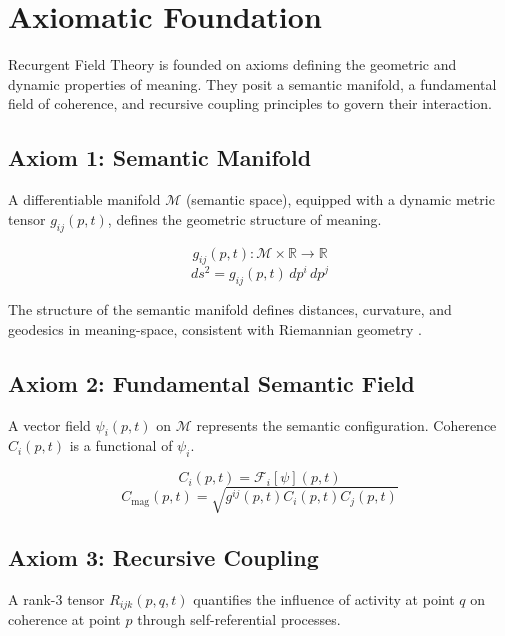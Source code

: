\chapter{Axiomatic Foundation}

Recurgent Field Theory is founded on axioms defining the geometric and dynamic properties of meaning. They posit a semantic manifold, a fundamental field of coherence, and recursive coupling principles to govern their interaction.

\section{Axiom 1: Semantic Manifold}

A differentiable manifold \(\mathcal{M}\) (semantic space), equipped with a dynamic metric tensor \(g_{ij}(p,t)\), defines the geometric structure of meaning.

\begin{equation}
g_{ij}(p,t) : \mathcal{M} \times \mathbb{R} \rightarrow \mathbb{R}
\end{equation}
\begin{equation}
ds^2 = g_{ij}(p,t) \, dp^i \, dp^j
\end{equation}

The structure of the semantic manifold defines distances, curvature, and geodesics in meaning-space, consistent with Riemannian geometry \autocite{Riemann1868}.

\section{Axiom 2: Fundamental Semantic Field}

A vector field \(\psi_i(p,t)\) on \(\mathcal{M}\) represents the semantic configuration. Coherence \(C_i(p,t)\) is a functional of \(\psi_i\).

\begin{equation}
C_i(p,t) = \mathcal{F}_i[\psi](p,t)
\end{equation}
\begin{equation}
C_{\text{mag}}(p,t) = \sqrt{g^{ij}(p,t) C_i(p,t) C_j(p,t)}
\end{equation}

\section{Axiom 3: Recursive Coupling}

A rank-3 tensor \(R_{ijk}(p,q,t)\) quantifies the influence of activity at point \(q\) on coherence at point \(p\) through self-referential processes.

